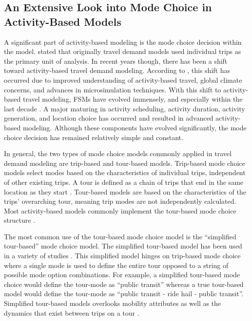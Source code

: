 \documentclass[3p, authoryear, review]{elsarticle} %
\begin{document}
\hypertarget{lit3}{%
\subsection{An Extensive Look into Mode Choice in Activity-Based Models}\label{lit3}}

A significant part of activity-based modeling is the mode choice decision within the model. \citet{bhat99} stated that originally travel demand models used individual trips as the primary unit of analysis. In recent years though, there has been a shift toward activity-based travel demand modeling. According to \citet{eluru10}, this shift has occurred due to improved understanding of activity-based travel, global climate concerns, and advances in microsimulation techniques. With this shift to activity-based travel modeling, FSMs have evolved immensely, and especially within the last decade \citep{hasnine21}. A major maturing in activity scheduling, activity duration, activity generation, and location choice has occurred and resulted in advanced activity-based modeling. Although these components have evolved significantly, the mode choice decision has remained relatively simple and constant.

In general, the two types of mode choice models commonly applied in travel demand modeling are trip-based and tour-based models. Trip-based mode choice models select modes based on the characteristics of individual trips, independent of other existing trips. A tour is defined as a chain of trips that end in the same location as they start \citep{bowman99}. Tour-based models are based on the characteristics of the trips' overarching tour, meaning trip modes are not independently calculated. Most activity-based models commonly implement the tour-based mode choice structure \citep{hasnine21}.

The most common use of the tour-based mode choice model is the ``simplified tour-based'' mode choice model. The simplified tour-based model has been used in a variety of studies \citep{arentze00, bowman01, pendyala97}. This simplified model hinges on trip-based mode choice where a single mode is used to define the entire tour opposed to a string of possible mode option combinations. For example, a simplified tour-based mode choice would define the tour-mode as ``public transit'' whereas a true tour-based model would define the tour-mode as ``public transit - ride hail - public transit''. Simplified tour-based models overlooks mobility attributes as well as the dynamics that exist between trips on a tour \citep{hasnine21}.
\end{document}
